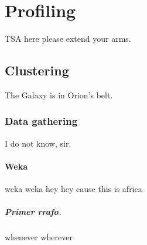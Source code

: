 \chapter{Profiling}

TSA here please extend your arms.

\section{Clustering}

The Galaxy is in Orion's belt.

\subsection{Data gathering}

I do not know, sir.

\subsubsection{Weka}

weka weka hey hey cause this is africa


\paragraph{Primer rrafo.}

whenever wherever
